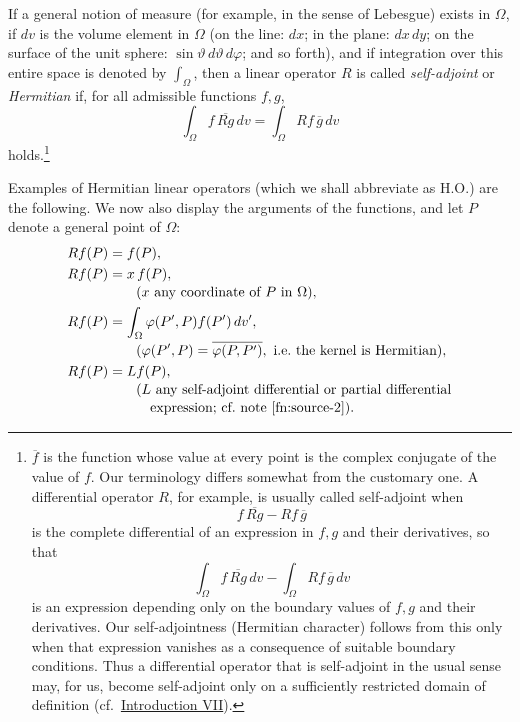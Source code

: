 ﻿\documentclass[paper=b5,fontsize=13pt,bookmarkpackage=false,twoside]{scrartcl}
\begin{document}
\newpage
If a general notion of measure (for example, in the sense of Lebesgue) exists in $\Omega$, if $dv$ is the volume element in $\Omega$ (on the line: $dx$; in the plane: $dx\,dy$; on the surface of the unit sphere: $\sin\vartheta\,d\vartheta\,d\varphi$; and so forth), and if integration over this entire space is denoted by $\int_\Omega$, then a linear operator $R$ is called \emph{self-adjoint} or \emph{Hermitian} if, for all admissible functions $f,g$,
\begingroup
{}
\[
 \int_\Omega f\,\overline{Rg}\,dv
 =
 \int_\Omega Rf\,\overline g\,dv
\]
\endgroup
\noindent
holds.\footnote{\label{fn:source-2}$\overline f$ is the function whose value at every point is the complex conjugate of the value of $f$. Our terminology differs somewhat from the customary one. A differential operator $R$, for example, is usually called self-adjoint when
\[
 f\,\overline{Rg}-Rf\,\overline g
\]
is the complete differential of an expression in $f,g$ and their derivatives, so that
\[
 \int_\Omega f\,\overline{Rg}\,dv-\int_\Omega Rf\,\overline g\,dv
\]
is an expression depending only on the boundary values of $f,g$ and their derivatives. Our self-adjointness (Hermitian character) follows from this only when that expression vanishes as a consequence of suitable boundary conditions. Thus a differential operator that is self-adjoint in the usual sense may, for us, become self-adjoint only on a sufficiently restricted domain of definition (cf.\ \hyperref[intro:VII]{Introduction VII}).}

Examples of Hermitian linear operators (which we shall abbreviate as H.O.) are the following. We now also display the arguments of the functions, and let $P$ denote a general point of $\Omega$:
\begin{align*}
 Rf(P)&=f(P),\\
 Rf(P)&=x\,f(P),\\[-0.2em]
 &\qquad\text{($x$ any coordinate of $P$ in $\Omega$)},\\
 Rf(P)&=\int_\Omega \varphi(P',P)f(P')\,dv',\\[-0.2em]
 &\qquad\text{(}\varphi(P',P)=\overline{\varphi(P,P')},
 \text{ i.e.\ the kernel is Hermitian}\text{)},\\
 Rf(P)&=Lf(P),\\[-0.2em]
 &\qquad\text{($L$ any self-adjoint differential or partial differential}\\[-0.2em]
 &\qquad\text{\quad expression; cf.\ note \ref{fn:source-2})}.
\end{align*}
\end{document}

